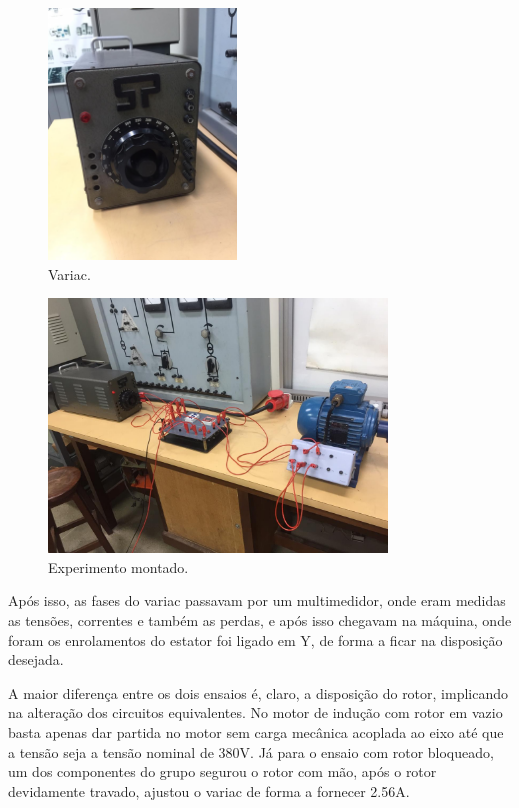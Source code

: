 \begin{figure}[h!]
\centering
    \includegraphics[width=5cm]{images/variac.jpeg}  
\caption{Variac.}
\label{variac} 
\end{figure}

\begin{figure}[h!]
\centering
    \includegraphics[width=9cm]{images/exp.jpeg}  
\caption{Experimento montado.}
\label{pratica} 
\end{figure}

 Após isso, as fases do variac passavam por um multimedidor, onde eram medidas as tensões, correntes e também as perdas, e após isso chegavam na máquina, onde foram os enrolamentos do estator foi ligado em Y, de forma a ficar na disposição desejada.

A maior diferença entre os dois ensaios é, claro, a disposição do rotor, implicando na alteração dos circuitos equivalentes. No motor de indução com rotor em vazio basta apenas dar partida no motor sem carga mecânica acoplada ao eixo até que a tensão seja a tensão nominal de 380V. Já para o ensaio com rotor bloqueado, um dos componentes do grupo segurou o rotor com mão, após o rotor devidamente travado, ajustou o variac de forma a fornecer 2.56A.

